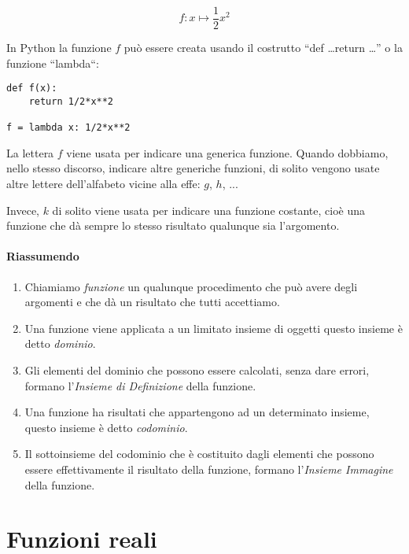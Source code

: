 $$f: x \mapsto \frac{1}{2}x^2$$

In Python la funzione $f$ può essere creata usando il costrutto 
``def \dots return \dots'' o la funzione ``lambda``:


\begin{lstlisting}
def f(x):
    return 1/2*x**2

f = lambda x: 1/2*x**2
\end{lstlisting}

\begin{osservazione}
La lettera $f$ viene usata per indicare una generica funzione. 
Quando dobbiamo, nello stesso discorso, indicare altre generiche funzioni, 
di solito vengono usate altre lettere dell'alfabeto vicine alla effe: $g$, 
$h$, ...

Invece, $k$ di solito viene usata per indicare una funzione costante, cioè 
una funzione che dà sempre lo stesso risultato qualunque sia l'argomento.
\end{osservazione}

\paragraph{Riassumendo}

\begin{enumerate} [noitemsep]
\item Chiamiamo \emph{funzione} un qualunque procedimento che può avere 
degli argomenti e che dà un risultato che tutti accettiamo.
\item Una funzione viene applicata a un limitato insieme di oggetti questo 
insieme è detto \emph{dominio}.
\item Gli elementi del dominio che possono essere calcolati, senza dare 
errori, formano l'\emph{Insieme di Definizione} della funzione.
\item Una funzione ha risultati che appartengono ad un determinato insieme, 
questo insieme è detto \emph{codominio}.
\item Il sottoinsieme del codominio che è costituito dagli elementi che 
possono essere effettivamente il risultato della funzione, formano 
l'\emph{Insieme Immagine} della funzione.
\end{enumerate}



\section{Funzioni reali}
\label{sec:funzioni2_}

